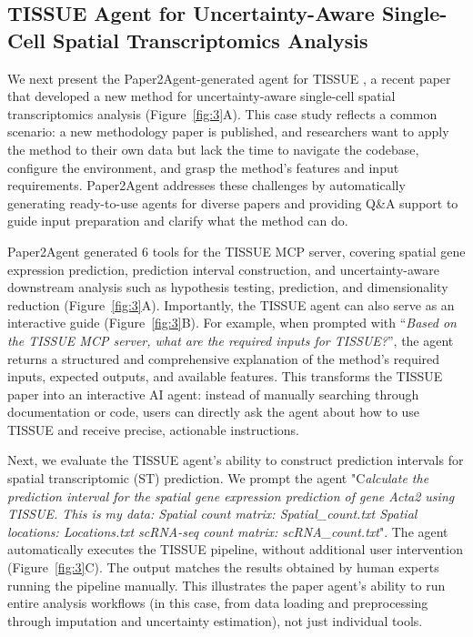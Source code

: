 \documentclass[11pt]{article}
\begin{document}
\subsection*{TISSUE Agent for Uncertainty-Aware Single-Cell Spatial Transcriptomics Analysis}

We next present the Paper2Agent-generated agent for TISSUE \citep{sun2024tissue}, a recent paper that developed a new method for uncertainty-aware single-cell spatial transcriptomics analysis (Figure~\ref{fig:3}A). This case study reflects a common scenario: a new methodology paper is published, and researchers want to apply the method to their own data but lack the time to navigate the codebase, configure the environment, and grasp the method’s features and input requirements. Paper2Agent addresses these challenges by automatically generating ready-to-use agents for diverse papers and providing Q\&A support to guide input preparation and clarify what the method can do.

Paper2Agent generated 6 tools for the TISSUE MCP server, covering spatial gene expression prediction, prediction interval construction, and uncertainty-aware downstream analysis such as hypothesis testing, prediction, and dimensionality reduction (Figure~\ref{fig:3}A). Importantly, the TISSUE agent can also serve as an interactive guide (Figure~\ref{fig:3}B). For example, when prompted with “\textit{Based on the TISSUE MCP server, what are the required inputs for TISSUE?}”, the agent returns a structured and comprehensive explanation of the method’s required inputs, expected outputs, and available features. This transforms the TISSUE paper into an interactive AI agent: instead of manually searching through documentation or code, users can directly ask the agent about how to use TISSUE and receive precise, actionable instructions.

Next, we evaluate the TISSUE agent’s ability to construct prediction intervals for spatial transcriptomic (ST) prediction. We prompt the agent "C\textit{alculate the prediction interval for the spatial gene expression prediction of
gene Acta2 using TISSUE. This is my data: Spatial count matrix: Spatial\_count.txt Spatial locations:
Locations.txt scRNA-seq count matrix: scRNA\_count.txt}". The agent automatically executes the TISSUE pipeline, without additional user intervention (Figure~\ref{fig:3}C). The output matches the results obtained by human experts running the pipeline manually. This illustrates the paper agent's ability to run entire analysis workflows (in this case, from data loading and preprocessing through imputation and uncertainty estimation), not just individual tools.
\end{document}
